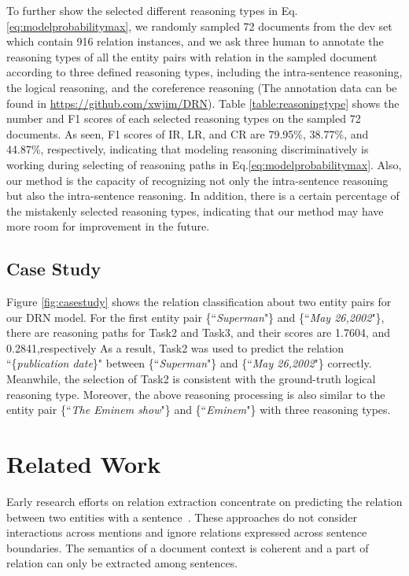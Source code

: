 \documentclass[11pt,a4paper]{article}
\begin{document}
To further show the selected different reasoning types in Eq.\eqref{eq:modelprobabilitymax}, we randomly sampled 72 documents from the dev set which contain 916 relation instances, and we ask three human to annotate the reasoning types of all the entity pairs with relation in the sampled document according to three defined reasoning types, including the intra-sentence reasoning, the logical reasoning, and the coreference reasoning (The annotation data can be found in \url{https://github.com/xwjim/DRN}).
Table \ref{table:reasoningtype} shows the number and F1 scores of each selected reasoning types on the sampled 72 documents.
As seen, F1 scores of IR, LR, and CR are 79.95\%, 38.77\%, and 44.87\%, respectively, indicating that modeling reasoning discriminatively is working during selecting of reasoning paths in Eq.\eqref{eq:modelprobabilitymax}.
Also, our method is the capacity of recognizing not only the intra-sentence reasoning but also the intra-sentence reasoning.
In addition, there is a certain percentage of the mistakenly selected reasoning types, indicating that our method may have more room for improvement in the future.

\subsection{Case Study}
Figure \ref{fig:casestudy} shows the relation classification about two entity pairs for our DRN model. 
For the first entity pair \{``\textit{Superman}"\} and \{``\textit{May 26,2002}"\}, there are reasoning paths for Task2 and Task3, and their scores are 1.7604, and 0.2841,respectively
As a result, Task2 was used to predict the relation ``\{\textit{publication date}\}" between \{``\textit{Superman}"\} and \{``\textit{May 26,2002}"\} correctly.
Meanwhile, the selection of Task2 is consistent with the ground-truth logical reasoning type.
Moreover, the above reasoning processing is also similar to the entity pair \{``\textit{The Eminem show}"\} and \{``\textit{Eminem}"\} with three reasoning types.

\section{Related Work}
Early research efforts on relation extraction concentrate on predicting the relation between two entities with a sentence~\cite{zeng-etal-2014-relation,zeng-etal-2015-distant,wang-etal-2016-relation,sorokin-gurevych-2017-context,reinclass,Song_2019,wei2019novel}. 
These approaches do not consider interactions across mentions and ignore relations expressed across sentence boundaries. The semantics of a document context is coherent and a part of relation can only be extracted among sentences. 
\end{document}

